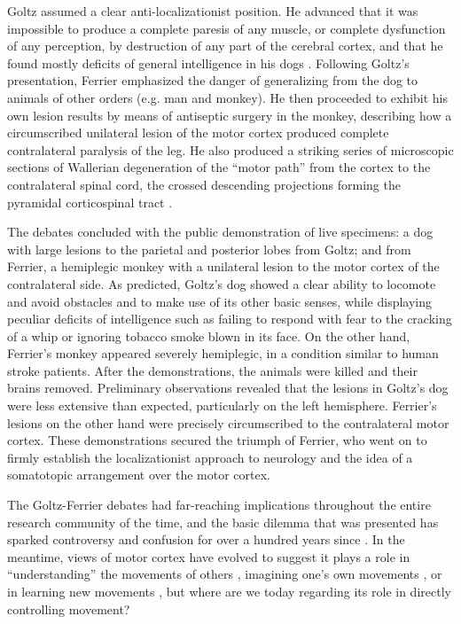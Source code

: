 Goltz assumed a clear anti-localizationist position. He advanced that it was impossible to produce a complete paresis of any muscle, or complete dysfunction of any perception, by destruction of any part of the cerebral cortex, and that he found mostly deficits of general intelligence in his dogs \citep{Tyler2000}. Following Goltz's presentation, Ferrier emphasized the danger of generalizing from the dog to animals of other orders (e.g. man and monkey). He then proceeded to exhibit his own lesion results by means of antiseptic surgery in the monkey, describing how a circumscribed unilateral lesion of the motor cortex produced complete contralateral paralysis of the leg. He also produced a striking series of microscopic sections of Wallerian degeneration \citep{Waller1850} of the ``motor path'' from the cortex to the contralateral spinal cord, the crossed descending projections forming the pyramidal corticospinal tract \citep{Tyler2000}.

The debates concluded with the public demonstration of live specimens: a dog with large lesions to the parietal and posterior lobes from Goltz; and from Ferrier, a hemiplegic monkey with a unilateral lesion to the motor cortex of the contralateral side. As predicted, Goltz's dog showed a clear ability to locomote and avoid obstacles and to make use of its other basic senses, while displaying peculiar deficits of intelligence such as failing to respond with fear to the cracking of a whip or ignoring tobacco smoke blown in its face. On the other hand, Ferrier's monkey appeared severely hemiplegic, in a condition similar to human stroke patients. After the demonstrations, the animals were killed and their brains removed. Preliminary observations revealed that the lesions in Goltz's dog were less extensive than expected, particularly on the left hemisphere. Ferrier's lesions on the other hand were precisely circumscribed to the contralateral motor cortex. These demonstrations secured the triumph of Ferrier, who went on to firmly establish the localizationist approach to neurology and the idea of a somatotopic arrangement over the motor cortex.

The Goltz-Ferrier debates had far-reaching implications throughout the entire research community of the time, and the basic dilemma that was presented has sparked controversy and confusion for over a hundred years since \citep{Phillips1984,Lashley1924,DeBarenne1933,Tyler2000,Gross2007}. In the meantime, views of motor cortex have evolved to suggest it plays a role in ``understanding'' the movements of others \citep{Rizzolatti2004}, imagining one's own movements \citep{Porro1996}, or in learning new movements \citep{Kawai2015}, but where are we today regarding its role in directly controlling movement?

